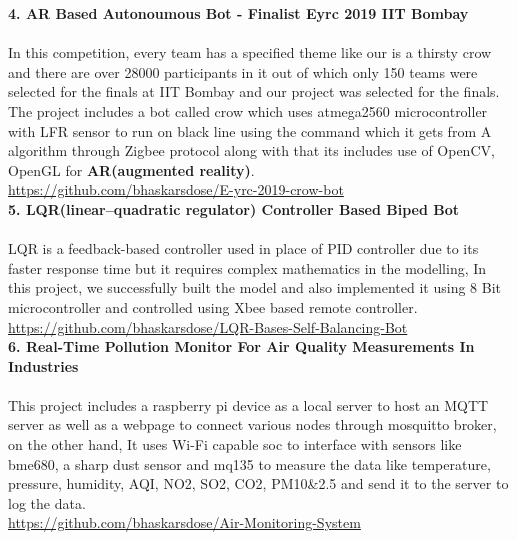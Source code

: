 \documentclass[10pt]{report}
\begin{document}
\noindent\textbf{\large 4. AR Based Autonoumous Bot - Finalist Eyrc 2019 IIT Bombay\\[1pt]}
\\In this competition, every team has a specified theme like our is a thirsty crow and there are over 28000 participants in it out of which only 150 teams were selected for the finals at IIT Bombay and our project was selected for the finals. The project includes a bot called crow which uses atmega2560 microcontroller with LFR sensor to run on black line using the command which it gets from A\* algorithm through Zigbee protocol along with that its includes use of OpenCV, OpenGL for \textbf{AR(augmented reality)}.
\\\faExternalLink\hspace{1pt} \url{https://github.com/bhaskarsdose/E-yrc-2019-crow-bot}
\\[2pt] 

\noindent\textbf{\large 5. LQR(linear–quadratic regulator) Controller Based Biped Bot\\[1pt]}
\\LQR is a feedback-based controller used in place of PID controller due to its faster response time but it requires complex mathematics in the modelling, In this project, we successfully built the model and also implemented it using 8 Bit microcontroller and controlled using Xbee based remote controller.
\\\faExternalLink\hspace{1pt} \url{https://github.com/bhaskarsdose/LQR-Bases-Self-Balancing-Bot}
\\[2pt] 


\noindent\textbf{\large 6. Real-Time Pollution Monitor For Air Quality Measurements In Industries\\[1pt] }
\\This project includes a raspberry pi device as a local server to host an MQTT server as well as a webpage to connect various nodes through mosquitto broker, on the other hand, It uses Wi-Fi capable soc to interface with sensors like bme680, a sharp dust sensor and mq135 to measure the data like temperature, pressure, humidity, AQI, NO2, SO2, CO2, PM10\&2.5 and send it to the server to log the data.
\\\faExternalLink\hspace{1pt} \url{https://github.com/bhaskarsdose/Air-Monitoring-System}           \\[2pt]
	 
\end{document}
